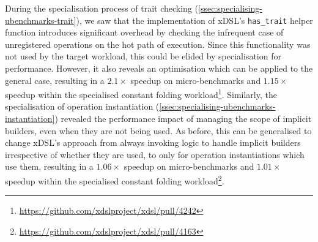 
During the specialisation process of trait checking (\autoref{ssec:specialising-ubenchmarks-trait}), we saw that the implementation of xDSL's \texttt{has\_trait} helper function introduces significant overhead by checking the infrequent case of unregistered operations on the hot path of execution.
Since this functionality was not used by the target workload, this could be elided by specialisation for performance. However, it also reveals an optimisation which can be applied to the general case, resulting in a $2.1\times$ speedup on micro-benchmarks and $1.15\times$ speedup within the specialised constant folding workload\footnote{\scriptsize{\url{https://github.com/xdslproject/xdsl/pull/4242}}}.
Similarly, the specialisation of operation instantiation (\autoref{ssec:specialising-ubenchmarks-instantiation}) revealed the performance impact of managing the scope of implicit builders, even when they are not being used. As before, this can be generalised to change xDSL's approach from always invoking logic to handle implicit builders irrespective of whether they are used, to only for operation instantiations which use them, resulting in a $1.06\times$ speedup on micro-benchmarks and $1.01\times$ speedup within the specialised constant folding workload\footnote{\scriptsize{\url{https://github.com/xdslproject/xdsl/pull/4163}}}.


